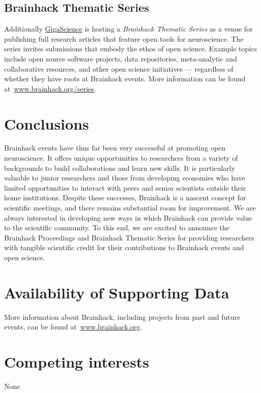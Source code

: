 \documentclass[11pt]{bmc_article_s50}
\begin{document}
\subsection{Brainhack Thematic Series}

Additionally \href{http://www.gigasciencejournal.com/}{GigaScience} is hosting a \emph{Brainhack Thematic Series} as a venue for publishing full research articles that feature open tools for neuroscience. The series invites submissions that embody the ethos of open science. Example topics include open source software projects, data repositories, meta-analytic and collaborative resources, and other open science initiatives --- regardless of whether they have roots at Brainhack events. More information can be found at~\href{http://brainhack.org/series/}{www.brainhack.org/series}.

\section{Conclusions}

Brainhack events have thus far been very successful at promoting open neuroscience. It offers unique opportunities to researchers from a variety of backgrounds to build collaborations and learn new skills. It is particularly valuable to junior researchers and those from developing economies who have limited opportunities to interact with peers and senior scientists outside their home institutions. Despite these successes, Brainhack is a nascent concept for scientific meetings, and there remains substantial room for improvement. We are always interested in developing new ways in which Brainhack can provide value to the scientific community. To this end, we are excited to announce the Brainhack Proceedings and Brainhack Thematic Series for providing researchers with tangible scientific credit for their contributions to Brainhack events and open science.


\newpage
\section*{Availability of Supporting Data}
More information about Brainhack, including projects from past and future events, can be found at~\href{http://www.brainhack.org}{www.brainhack.org}.

\section*{Competing interests}
None
\end{document}

